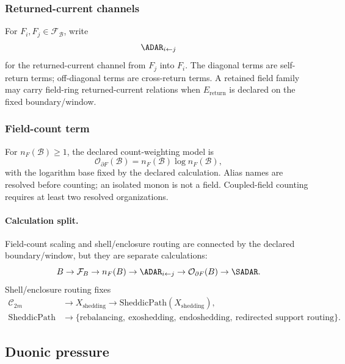 \subsubsection{Returned-current channels}\label{subsec:returned-current-channels}
For \(F_i,F_j\in\mathcal F_{\mathcal B}\), write
\[
\ADAR_{i\leftarrow j}
\]
for the returned-current channel from \(F_j\) into \(F_i\). The diagonal terms are self-return terms; off-diagonal terms are cross-return terms. A retained field family may carry field-ring returned-current relations when \(E_{\mathrm{return}}\) is declared on the fixed boundary/window.

\subsubsection{Field-count term}\label{subsec:field-count-term}
For \(n_F(\mathcal B)\ge1\), the declared count-weighting model is
\begin{equation}
\mathcal O_{\partial F}(\mathcal B)=n_F(\mathcal B)\log n_F(\mathcal B),
\label{eq:field-count-term}
\end{equation}
with the logarithm base fixed by the declared calculation. Alias names are
resolved before counting; an isolated monon is not a field. Coupled-field
counting requires at least two resolved organizations.

\paragraph{Calculation split.}
Field-count scaling and shell/enclosure routing are connected by the declared boundary/window, but they are separate calculations:
\[
B\to \mathcal F_{B}\to n_F(B)\to \ADAR_{i\leftarrow j}\to \mathcal O_{\partial F}(B)\to \SADAR.
\]
Shell/enclosure routing fixes
\[
\begin{aligned}
\mathcal C_{2m}
&\to X_{\mathrm{shedding}}
\to \mathrm{SheddicPath}(X_{\mathrm{shedding}}),\\
\mathrm{SheddicPath}
&\to
\{\text{rebalancing},\ \text{exoshedding},\ \text{endoshedding},\ \text{redirected support routing}\}.
\end{aligned}
\]




\subsection{Duonic pressure}\label{sec:duonic-pressure-inertia}

